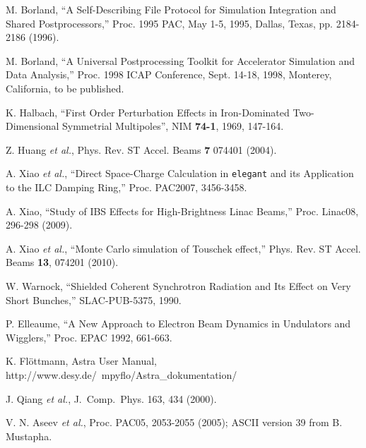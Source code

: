 \documentclass[11pt]{article}
\begin{document}
\begin{thebibliography}{9}

M. Borland, ``A Self-Describing File Protocol for Simulation
Integration and Shared Postprocessors,'' Proc. 1995 PAC, May 1-5,
1995, Dallas, Texas, pp. 2184-2186 (1996).

M. Borland, ``A Universal Postprocessing Toolkit for Accelerator 
Simulation and Data Analysis,'' Proc. 1998 ICAP Conference, 
Sept. 14-18, 1998, Monterey, California, to be published.

    K. Halbach, ``First Order Perturbation Effects in Iron-Dominated Two-Dimensional Symmetrial Multipoles'',
    NIM {\bf 74-1}, 1969, 147-164.

  Z. Huang {\em et al.}, Phys. Rev. ST Accel. Beams {\bf 7} 074401 (2004).

  A. Xiao {\em et al.}, ``Direct Space-Charge Calculation in {\tt elegant} and its Application to the
 ILC Damping Ring,'' Proc. PAC2007, 3456-3458.

  A. Xiao, ``Study of IBS Effects for High-Brightness Linac Beams,'' Proc. Linac08, 296-298 (2009).

  A. Xiao {\em et al.}, ``Monte Carlo simulation of Touschek effect,'' Phys. Rev. ST Accel. Beams {\bf 13},
  074201 (2010).

  W. Warnock, ``Shielded Coherent Synchrotron Radiation and Its Effect on Very Short Bunches,'' SLAC-PUB-5375, 1990.

  P. Elleaume, ``A New Approach to Electron Beam Dynamics in Undulators and Wigglers,'' Proc. EPAC 1992, 661-663.

  K. Fl\"{o}ttmann, Astra User Manual, http://www.desy.de/~mpyflo/Astra\_dokumentation/

J. Qiang {\em et al.},  J.~Comp.~Phys. 163, 434 (2000).

  V. N. Aseev {\em et al.}, Proc. PAC05, 2053-2055 (2005); ASCII version 39 from B. Mustapha.

\end{thebibliography}
\end{document}
